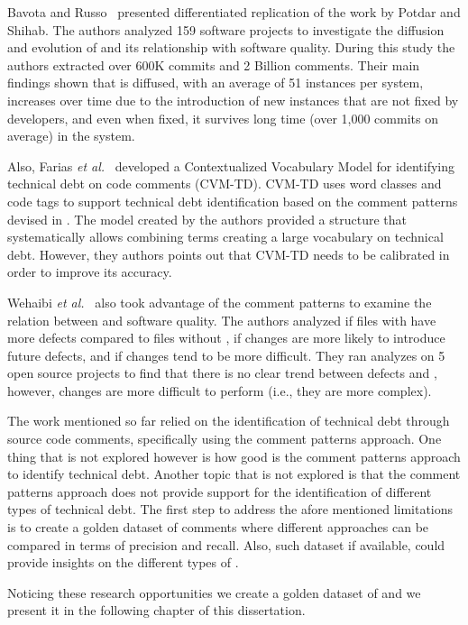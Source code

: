 Bavota and Russo~\cite{bavota2016MSR} presented differentiated replication of the work by Potdar and Shihab. The authors analyzed 159 software projects to investigate the diffusion and evolution of \SATD and its relationship with software quality. During this study the authors extracted over 600K commits and 2 Billion comments. Their main findings shown that \SATD is diffused, with an average of 51 instances per system, increases over time due to the introduction of new instances that are not fixed by developers, and even when fixed, it survives long time (over 1,000 commits on average) in the system.

Also, Farias \textit{et al.}~\cite{Farias2015MTD} developed a Contextualized Vocabulary Model for identifying technical debt on code comments (CVM-TD). CVM-TD uses word classes and code tags to support technical debt identification based on the comment patterns devised in \cite{Potdar2014ICSME}. The model created by the authors provided a structure that systematically allows combining terms creating a large vocabulary on technical debt. However, they authors points out that  CVM-TD needs to be calibrated in order to improve its accuracy. 

Wehaibi \textit{et al.}~\cite{wehaibi2016SANER} also took advantage of the comment patterns to examine the relation between \SATD and software quality. The authors analyzed if files with \SATD have more defects compared to files without \SATD, if \SATD changes are more likely to introduce future defects, and if \SATD changes tend to be more difficult. They ran analyzes on 5 open source projects to find that there is no clear trend between defects and \SATD, however, \SATD changes are more difficult to perform (i.e., they are more complex).

The work mentioned so far relied on the identification of technical debt through source code comments, specifically using the comment patterns approach. One thing that is not explored however is how good is the comment patterns approach to identify technical debt. Another topic that is not explored is that the comment patterns approach does not provide support for the identification of different types of technical debt. The first step to address the afore mentioned limitations is to create a golden dataset of \SATD comments where different approaches can be compared in terms of precision and recall. Also, such dataset if available, could provide insights on the different types of \SATD. 

Noticing these research opportunities we create a golden dataset of \SATD and we present it in the following chapter of this dissertation.